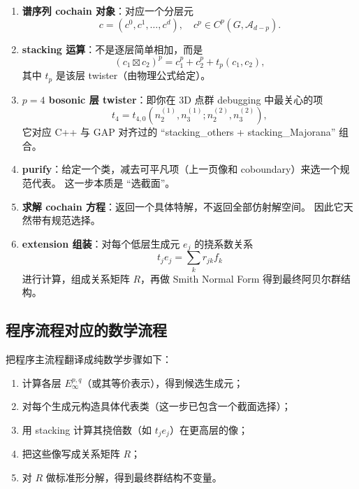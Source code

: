 \documentclass[a4paper,fontset=ubuntu,12pt]{ctexart}
\begin{document}
\begin{enumerate}
\item \textbf{谱序列 cochain 对象}：对应一个分层元
\begin{equation}
c=(c^0,c^1,\dots,c^d),\quad c^p\in C^p(G,\mathcal{A}_{d-p}).
\label{eq:layered-cochain}
\end{equation}

\item \textbf{stacking 运算}：不是逐层简单相加，而是
\begin{equation}
(c_1\boxtimes c_2)^p=c_1^p+c_2^p+t_p(c_1,c_2),
\label{eq:stack-rule}
\end{equation}
其中 $t_p$ 是该层 twister（由物理公式给定）。

\item \textbf{$p=4$ bosonic 层 twister}：即你在 3D 点群 debugging 中最关心的项
\begin{equation}
t_4=t_{4,0}(n_{2}^{(1)},n_{3}^{(1)};n_{2}^{(2)},n_{3}^{(2)}),
\label{eq:t4}
\end{equation}
它对应 C++ 与 GAP 对齐过的 ``stacking\_others + stacking\_Majorana'' 组合。

\item \textbf{purify}：给定一个类，减去可平凡项（上一页像和 coboundary）来选一个规范代表。
这一步本质是 ``选截面''。

\item \textbf{求解 cochain 方程}：返回一个具体特解，不返回全部仿射解空间。
因此它天然带有规范选择。

\item \textbf{extension 组装}：对每个低层生成元 $e_j$ 的挠系数关系
\begin{equation}
t_j e_j = \sum_k r_{jk} f_k
\label{eq:extension-relation}
\end{equation}
进行计算，组成关系矩阵 $R$，再做 Smith Normal Form 得到最终阿贝尔群结构。
\end{enumerate}

\subsection{程序流程对应的数学流程}

把程序主流程翻译成纯数学步骤如下：

\begin{enumerate}
\item 计算各层 $E_\infty^{p,q}$（或其等价表示），得到候选生成元；
\item 对每个生成元构造具体代表类（这一步已包含一个截面选择）；
\item 用 stacking 计算其挠倍数（如 $t_j e_j$）在更高层的像；
\item 把这些像写成关系矩阵 $R$；
\item 对 $R$ 做标准形分解，得到最终群结构不变量。
\end{enumerate}
\end{document}
